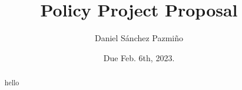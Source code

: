 \documentclass{article}
\title{Policy Project Proposal}
\author{Daniel Sánchez Pazmiño}
\date{Due Feb. 6th, 2023.}
\begin{document}
\maketitle

\begin{abstract}
    hello
\end{abstract}
\end{document}

